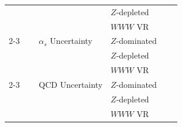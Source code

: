\begin{table}[ht!]
{\begin{tabular}{llrl}
                                                                                                       & $Z$-depleted    \\
                                                                                                       & $WWW$ VR        \\
    \cline{2-3}                                                                                               
    ~~~~$\alpha_{s}$ Uncertainty                                                                       & $Z$-dominated  \\
                                                                                                       & $Z$-depleted    \\
                                                                                                       & $WWW$ VR        \\
    \cline{2-3}                                                                                               
    ~~~~QCD Uncertainty                                                                                & $Z$-dominated   \\
                                                                                                       & $Z$-depleted    \\
                                                                                                       & $WWW$ VR        \\
    \end{tabular}
  }
\end{table}
